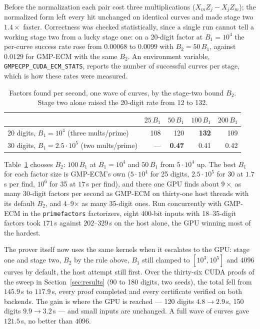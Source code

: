 \documentclass[11pt,a4paper]{article}
\newcommand{\code}[1]{\texttt{#1}}
\begin{document}
Before the normalization each pair cost three multiplications ($X_m Z_j - X_j Z_m$); the
normalized form left every hit unchanged on identical curves and made stage two $1.4\times$
faster. Correctness was checked statistically, since a single run cannot tell a working stage
two from a lucky stage one: on a 20-digit factor at $B_1 = 10^4$ the per-curve success rate rose
from $0.00068$ to $0.0099$ with $B_2 = 50\,B_1$, against $0.0129$ for GMP-ECM with the same $B_2$.
An environment variable, \code{GMPECPP\_CUDA\_ECM\_STATS}, reports the number of successful curves
per stage, which is how these rates were measured.

\begin{table}[t]
\centering
\begin{tabular}{lrrrr}
\toprule
 & $25\,B_1$ & $50\,B_1$ & $100\,B_1$ & $200\,B_1$ \\
\midrule
20 digits, $B_1 = 10^4$ (three mults/prime) & 108 & 120 & \textbf{132} & 109 \\
30 digits, $B_1 = 2.5\cdot10^5$ (two mults/prime) & --- & \textbf{0.47} & 0.41 & 0.42 \\
\bottomrule
\end{tabular}
\caption{Factors found per second, one wave of curves, by the stage-two bound $B_2$. Stage two
  alone raised the 20-digit rate from 12 to 132.}
\label{tab:stage2}
\end{table}

Table~\ref{tab:stage2} chooses $B_2$: $100\,B_1$ at $B_1 = 10^4$ and $50\,B_1$ from $5\cdot10^4$ up.
The best $B_1$ for each factor size is GMP-ECM's own ($5\cdot10^4$ for 25 digits, $2.5\cdot10^5$ for
30 at $1.7$\,s per find, $10^6$ for 35 at $17$\,s per find), and there one GPU finds about
$9\times$ as many 30-digit factors per second as GMP-ECM on thirty-one host threads with its default
$B_2$, and 4--9$\times$ as many 35-digit ones. Run concurrently with GMP-ECM in the
\code{primefactors} factorizers, eight 400-bit inputs with 18--35-digit factors took $171$\,s
against $202$--$329$\,s on the host alone, the GPU winning most of the hardest.

The prover itself now uses the same kernels when it escalates to the GPU: stage one and stage
two, $B_2$ by the rule above, $B_1$ still clamped to $[10^3, 10^5]$ and $4096$ curves by default,
the host attempt still first. Over the thirty-six CUDA proofs of the sweep in
Section~\ref{sec:results} (90 to 180 digits, two seeds), the total fell from $145.9$\,s to
$117.9$\,s, every proof completed and every certificate verified on both backends. The gain is
where the GPU is reached --- 120 digits $4.8 \to 2.9$\,s, 150 digits $9.9 \to 3.2$\,s --- and
small inputs are unchanged. A full wave of curves gave $121.5$\,s, no better than $4096$.
\end{document}
